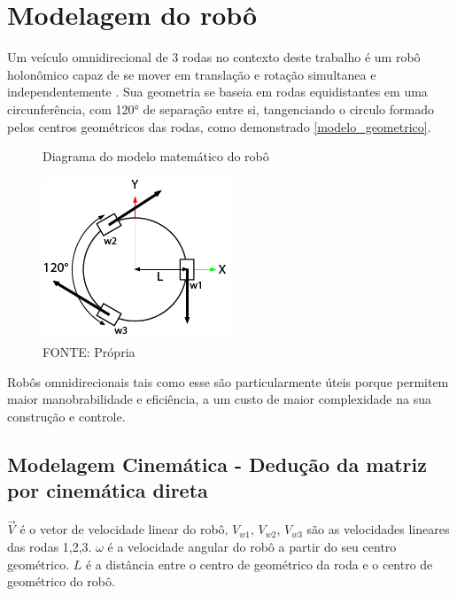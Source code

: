 
\section{Modelagem do robô}

Um veículo omnidirecional de 3 rodas no contexto deste trabalho é um robô
holonômico capaz de se mover em translação e rotação simultanea e
independentemente \cite{mobile_manipulator_robot}. Sua geometria se 
baseia em rodas equidistantes em uma circunferência, com 120° de separação entre
si, tangenciando o circulo formado pelos centros geométricos das rodas,
como demonstrado \autoref{modelo_geometrico}.

\begin{figure}[ht]
	\centering
	\caption{Diagrama do modelo matemático do robô}
	\label{modelo_geometrico}
	\includegraphics{figures/model}
	\caption*{FONTE: Própria}
\end{figure}

Robôs omnidirecionais tais como esse são particularmente úteis porque permitem
 maior manobrabilidade e eficiência, a um custo de maior complexidade na sua
 construção e controle. \cite{vectorial_speeds_simulations}

\subsection{Modelagem Cinemática - Dedução da matriz por cinemática direta}

$\overrightarrow{V}$ é o vetor de velocidade linear do robô, $V_{w1}$, $V_{w2}$,
$V_{w3}$ são as velocidades lineares das rodas 1,2,3. 
$\omega $ é a velocidade angular do robô a partir do seu centro geométrico.
$L$ é a distância entre o centro de geométrico da roda e o centro de geométrico
do robô.

